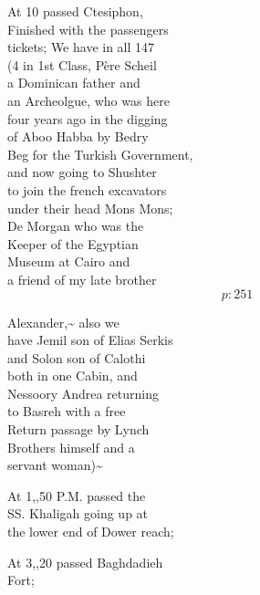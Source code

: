 \documentclass{report}
\begin{document}
	\par{
 	At 10 passed Ctesiphon,\ \\Finished with the passengers\ \\tickets; We have in all 147\ \\(4 in 1st Class, Père Scheil\ \\a Dominican father and\ \\an Archeolgue, who was here\ \\four years ago in the digging\ \\of Aboo Habba by Bedry\ \\Beg for the Turkish Government,\ \\and now going to Shushter\ \\to join the french excavators\ \\under their head Mons Mons;\ \\De Morgan who was the\ \\Keeper of the Egyptian\ \\Museum at Cairo and\ \\a friend of my late brother\ \\
  \[p: 251 \]

	}





	\par{
 	Alexander,\~{} also we\ \\have Jemil son of Elias Serkis\ \\and Solon son of Calothi\ \\both in one Cabin, and\ \\Nessoory Andrea returning\ \\to Basreh with a free\ \\Return passage by Lynch\ \\Brothers himself and a\ \\servant woman)\~{}\ \\
	}

	\par{
 	At 1,,50 P.M. passed the\ \\SS. Khaligah going up at\ \\the lower end of Dower reach;\ \\
	}

	\par{
 	At 3,,20 passed Baghdadieh\ \\Fort;\ \\
	}
\end{document}

